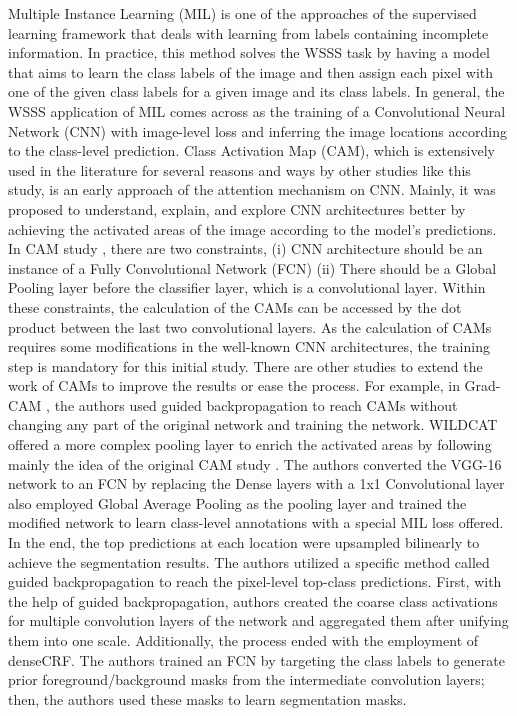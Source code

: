 \documentclass[sn-mathphys]{sn-jnl}
\theoremstyle{thmstyleone}
\theoremstyle{thmstyletwo}\newtheorem{example}{Example}\newtheorem{remark}{Remark}
\theoremstyle{thmstylethree}\newtheorem{definition}{Definition}
\begin{document}
Multiple Instance Learning (MIL) is one of the approaches of the supervised learning framework that deals with learning from labels containing incomplete information. In practice, this method solves the WSSS task by having a model that aims to learn the class labels of the image and then assign each pixel with one of the given class labels for a given image and its class labels. In general, the WSSS application of MIL comes across as the training of a Convolutional Neural Network (CNN) with image-level loss and inferring the image locations according to the class-level prediction. Class Activation Map (CAM), which is extensively used in the literature for several reasons and ways by other studies like this study, is an early approach of the attention mechanism on CNN. Mainly, it was proposed to understand, explain, and explore CNN architectures better by achieving the activated areas of the image according to the model’s predictions. In CAM study \cite{cam}, there are two constraints, (i) CNN architecture should be an instance of a Fully Convolutional Network (FCN) (ii) There should be a Global Pooling layer before the classifier layer, which is a convolutional layer. Within these constraints, the calculation of the CAMs can be accessed by the dot product between the last two convolutional layers. As the calculation of CAMs requires some modifications in the well-known CNN architectures, the training step is mandatory for this initial study. There are other studies to extend the work of CAMs to improve the results or ease the process. For example, in Grad-CAM \cite{DBLP:journals/corr/SelvarajuDVCPB16}, the authors used guided backpropagation to reach CAMs without changing any part of the original network and training the network. WILDCAT \cite{8100114} offered a more complex pooling layer to enrich the activated areas by following mainly the idea of the original CAM study \cite{cam}. The authors \cite{pathak2015fully} converted the VGG-16 \cite{vgg} network to an FCN by replacing the Dense layers with a 1x1 Convolutional layer also employed Global Average Pooling as the pooling layer and trained the modified network to learn class-level annotations with a special MIL loss offered. In the end, the top predictions at each location were upsampled bilinearly to achieve the segmentation results. The authors  \cite{10.1007/978-3-319-46493-0_14} utilized a specific method called guided backpropagation to reach the pixel-level top-class predictions. First, with the help of guided backpropagation, authors created the coarse class activations for multiple convolution layers of the network and aggregated them after unifying them into one scale. Additionally, the process ended with the employment of denseCRF. The authors \cite{DBLP:journals/corr/SalehASPGA16} trained an FCN by targeting the class labels to generate prior foreground/background masks from the intermediate convolution layers; then, the authors used these masks to learn segmentation masks. 
\end{document}
